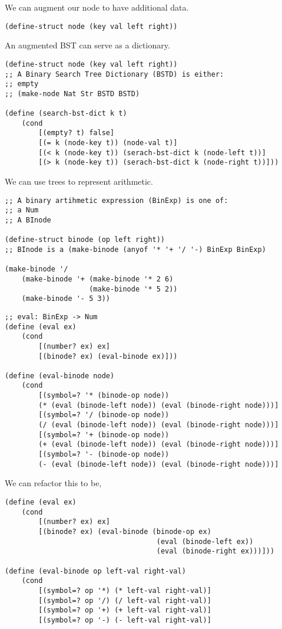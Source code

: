 \documentclass{article}
\begin{document}
We can augment our node to have additional data. 

\begin{lstlisting}
(define-struct node (key val left right))
\end{lstlisting}

An augmented BST can serve as a dictionary. 

\begin{lstlisting}
(define-struct node (key val left right))
;; A Binary Search Tree Dictionary (BSTD) is either:
;; empty
;; (make-node Nat Str BSTD BSTD)

(define (search-bst-dict k t)
    (cond
        [(empty? t) false]
        [(= k (node-key t)) (node-val t)]
        [(< k (node-key t)) (serach-bst-dict k (node-left t))]
        [(> k (node-key t)) (serach-bst-dict k (node-right t))]))
\end{lstlisting}

We can use trees to represent arithmetic. 

\begin{lstlisting}
;; A binary artihmetic expression (BinExp) is one of:
;; a Num
;; A BInode

(define-struct binode (op left right))
;; BInode is a (make-binode (anyof '* '+ '/ '-) BinExp BinExp)

(make-binode '/
    (make-binode '+ (make-binode '* 2 6)
                    (make-binode '* 5 2))
    (make-binode '- 5 3))
\end{lstlisting}

\begin{lstlisting}
;; eval: BinExp -> Num
(define (eval ex)
    (cond
        [(number? ex) ex]
        [(binode? ex) (eval-binode ex)]))

(define (eval-binode node)
    (cond
        [(symbol=? '* (binode-op node))
        (* (eval (binode-left node)) (eval (binode-right node)))]
        [(symbol=? '/ (binode-op node))
        (/ (eval (binode-left node)) (eval (binode-right node)))]
        [(symbol=? '+ (binode-op node))
        (+ (eval (binode-left node)) (eval (binode-right node)))]
        [(symbol=? '- (binode-op node))
        (- (eval (binode-left node)) (eval (binode-right node)))]
\end{lstlisting}

We can refactor this to be,

\begin{lstlisting}
(define (eval ex)
    (cond
        [(number? ex) ex]
        [(binode? ex) (eval-binode (binode-op ex)
                                    (eval (binode-left ex))
                                    (eval (binode-right ex)))]))

(define (eval-binode op left-val right-val)
    (cond
        [(symbol=? op '*) (* left-val right-val)]
        [(symbol=? op '/) (/ left-val right-val)]
        [(symbol=? op '+) (+ left-val right-val)]
        [(symbol=? op '-) (- left-val right-val)]
\end{lstlisting}
\end{document}
